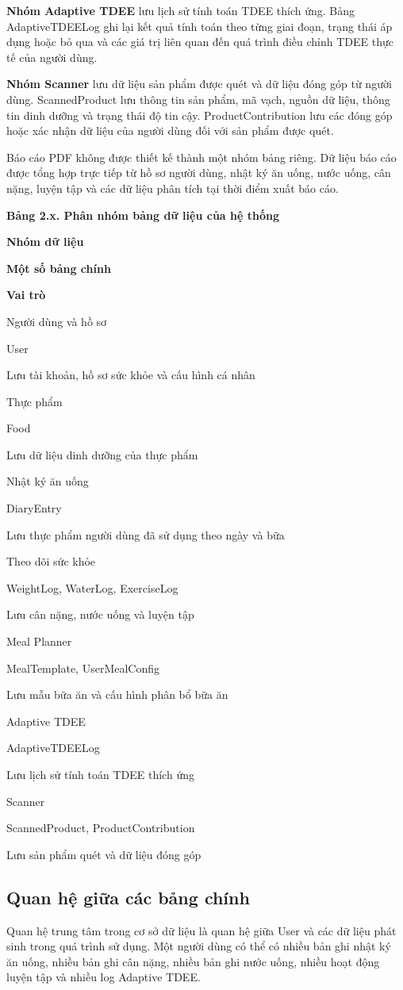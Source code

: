 \documentclass[12pt, a4paper]{report}
\begin{document}
\textbf{Nhóm Adaptive TDEE} lưu lịch sử tính toán TDEE thích ứng. Bảng AdaptiveTDEELog ghi lại kết quả tính toán theo từng giai đoạn, trạng thái áp dụng hoặc bỏ qua và các giá trị liên quan đến quá trình điều chỉnh TDEE thực tế của người dùng.

\textbf{Nhóm Scanner} lưu dữ liệu sản phẩm được quét và dữ liệu đóng góp từ người dùng. ScannedProduct lưu thông tin sản phẩm, mã vạch, nguồn dữ liệu, thông tin dinh dưỡng và trạng thái độ tin cậy. ProductContribution lưu các đóng góp hoặc xác nhận dữ liệu của người dùng đối với sản phẩm được quét.

Báo cáo PDF không được thiết kế thành một nhóm bảng riêng. Dữ liệu báo cáo được tổng hợp trực tiếp từ hồ sơ người dùng, nhật ký ăn uống, nước uống, cân nặng, luyện tập và các dữ liệu phân tích tại thời điểm xuất báo cáo.

\textbf{Bảng 2.x. Phân nhóm bảng dữ liệu của hệ thống}

\textbf{Nhóm dữ liệu}

\textbf{Một số bảng chính}

\textbf{Vai trò}

Người dùng và hồ sơ

User

Lưu tài khoản, hồ sơ sức khỏe và cấu hình cá nhân

Thực phẩm

Food

Lưu dữ liệu dinh dưỡng của thực phẩm

Nhật ký ăn uống

DiaryEntry

Lưu thực phẩm người dùng đã sử dụng theo ngày và bữa

Theo dõi sức khỏe

WeightLog, WaterLog, ExerciseLog

Lưu cân nặng, nước uống và luyện tập

Meal Planner

MealTemplate, UserMealConfig

Lưu mẫu bữa ăn và cấu hình phân bổ bữa ăn

Adaptive TDEE

AdaptiveTDEELog

Lưu lịch sử tính toán TDEE thích ứng

Scanner

ScannedProduct, ProductContribution

Lưu sản phẩm quét và dữ liệu đóng góp

\subsection{Quan hệ giữa các bảng chính}Quan hệ trung tâm trong cơ sở dữ liệu là quan hệ giữa User và các dữ liệu phát sinh trong quá trình sử dụng. Một người dùng có thể có nhiều bản ghi nhật ký ăn uống, nhiều bản ghi cân nặng, nhiều bản ghi nước uống, nhiều hoạt động luyện tập và nhiều log Adaptive TDEE.
\end{document}
